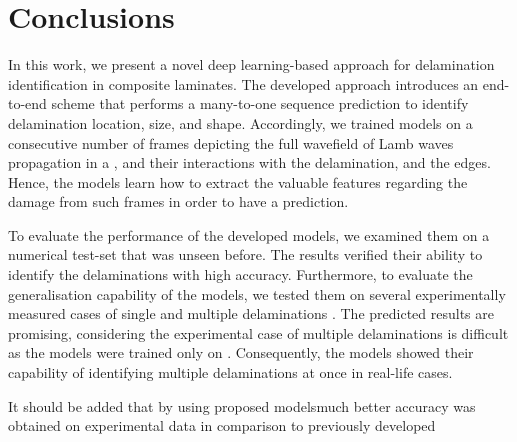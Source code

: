 \section{Conclusions}
\label{conclusion}
In this work, we present a novel deep learning-based approach for delamination identification in composite laminates.
The developed approach introduces an end-to-end scheme that performs a many-to-one sequence prediction to identify delamination location, size, and shape.
Accordingly, we trained \DIFdelbegin {}\DIFdelend \DIFaddbegin {}\DIFaddend models on a consecutive number of frames depicting the full wavefield of Lamb waves propagation in a \DIFdelbegin {}\DIFdelend \DIFaddbegin {}\DIFaddend , and their interactions with the delamination, and the edges.
Hence, the models learn how to extract the valuable features regarding the damage from such frames in order to have a prediction.

To evaluate the performance of the developed models, we examined them on a numerical test-set that was unseen before.
The results verified their ability to identify the delaminations with high accuracy. 
\DIFaddbegin {} \DIFaddend Furthermore, to evaluate the generalisation capability of the models, we tested them on several experimentally measured cases of single and multiple delaminations \DIFdelbegin {}\DIFdelend \DIFaddbegin {}\DIFaddend .
The predicted results are promising, considering the experimental case of multiple delaminations is difficult as the models were trained only on \DIFdelbegin {}\DIFdelend \DIFaddbegin {}\DIFaddend .
Consequently, the \DIFaddbegin {}\DIFaddend models showed their capability of identifying multiple delaminations at once in real-life cases.

It should be added that by using proposed models\DIFaddbegin \DIFadd{, }\DIFaddend much better accuracy was obtained on experimental data in comparison to previously developed \DIFdelbegin {}\DIFdelend \DIFaddbegin {}

